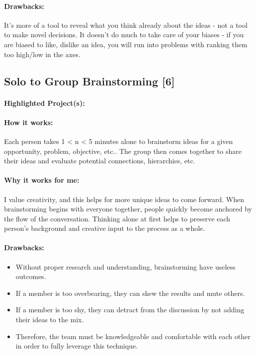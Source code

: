 \documentclass[a4paper,12pt]{article}
\begin{document}
\paragraph{Drawbacks: }
It’s more of a tool to reveal what you think already about the ideas - not a tool to make novel decisions. It doesn’t do much to take care of your biases - if you are biased to {like, dislike} an idea, you will run into problems with ranking them too high/low in the axes.

\subsection{Solo to Group Brainstorming [6]}
\paragraph{Highlighted Project(s): }
\paragraph{How it works: } 
Each person takes 1 < n < 5 minutes alone to brainstorm ideas for a given {opportunity, problem, objective, etc.}. The group then comes together to share their ideas and evaluate potential {connections, hierarchies, etc.}

\paragraph{Why it works for me: }
I value creativity, and this helps for more unique ideas to come forward. When brainstorming begins with everyone together, people quickly become anchored by the flow of the conversation. Thinking alone at first helps to preserve each person’s background and creative input to the process as a whole.


\paragraph{Drawbacks: }
\begin{itemize}
	\item Without proper research and understanding, brainstorming have useless outcomes.
	\item If a member is too overbearing, they can skew the results and mute others.
	\item If a member is too shy, they can detract from the discussion by not adding their ideas to the mix.
	\item Therefore, the team must be knowledgeable and comfortable with each other in order to fully leverage this technique.
\end{itemize}
\end{document}
